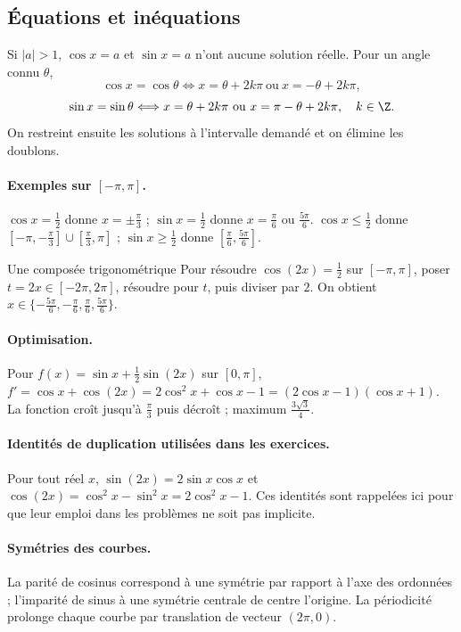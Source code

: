 \subsection{Équations et inéquations}
Si $|a|>1$, $\cos x=a$ et $\sin x=a$ n'ont aucune solution réelle. Pour un angle connu $\theta$,
\[\cos x=\cos\theta\Longleftrightarrow x=\theta+2k\pi\ \text{ou}\ x=-\theta+2k\pi,\]
\[\sin x=\sin\theta\Longleftrightarrow x=\theta+2k\pi\ \text{ou}\ x=\pi-\theta+2k\pi,\quad k\in\Z.\]
On restreint ensuite les solutions à l'intervalle demandé et on élimine les doublons.
\paragraph{Exemples sur $[-\pi,\pi]$.} $\cos x=\frac{1}{2}$ donne $x=\pm\frac{\pi}{3}$ ; $\sin x=\frac{1}{2}$ donne $x=\frac{\pi}{6}$ ou $\frac{5\pi}{6}$. $\cos x\le\frac{1}{2}$ donne $[-\pi,-\frac{\pi}{3}]\cup[\frac{\pi}{3},\pi]$ ; $\sin x\ge\frac{1}{2}$ donne $[\frac{\pi}{6},\frac{5\pi}{6}]$.
\begin{methode}{Une composée trigonométrique}
Pour résoudre $\cos (2x)=\frac{1}{2}$ sur $[-\pi,\pi]$, poser $t=2x\in[-2\pi,2\pi]$, résoudre pour $t$, puis diviser par $2$. On obtient $x\in\{-\frac{5\pi}{6},-\frac{\pi}{6},\frac{\pi}{6},\frac{5\pi}{6}\}$.
\end{methode}
\paragraph{Optimisation.} Pour $f(x)=\sin x+\frac12\sin(2x)$ sur $[0,\pi]$, $f'=\cos x+\cos(2x)=2\cos^2x+\cos x-1=(2\cos x-1)(\cos x+1)$. La fonction croît jusqu'à $\frac{\pi}{3}$ puis décroît ; maximum $\frac{3\sqrt{3}}{4}$.
\paragraph{Identités de duplication utilisées dans les exercices.} Pour tout réel $x$, $\sin(2x)=2\sin x\cos x$ et $\cos(2x)=\cos^2x-\sin^2x=2\cos^2x-1$. Ces identités sont rappelées ici pour que leur emploi dans les problèmes ne soit pas implicite.
\paragraph{Symétries des courbes.} La parité de cosinus correspond à une symétrie par rapport à l'axe des ordonnées ; l'imparité de sinus à une symétrie centrale de centre l'origine. La périodicité prolonge chaque courbe par translation de vecteur $(2\pi,0)$.


